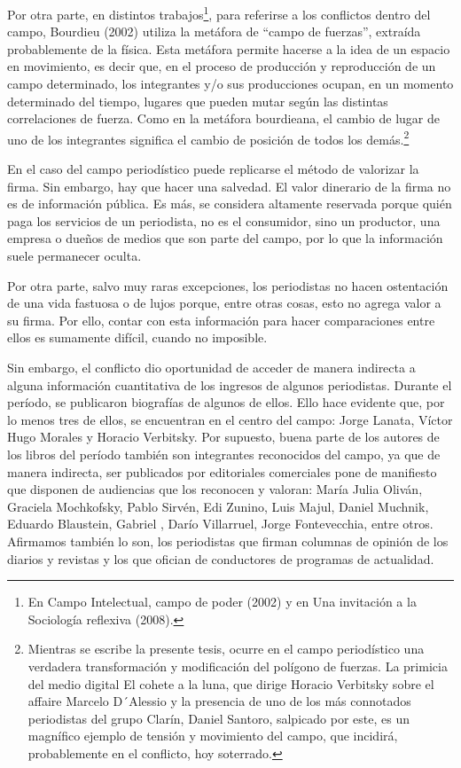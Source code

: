 Por otra parte, en distintos trabajos\footnote{En Campo Intelectual, campo de poder (2002) y en Una invitación a la Sociología reflexiva (2008).}, para referirse a los conflictos dentro del campo, Bourdieu (2002) utiliza la metáfora de ``campo de fuerzas'', extraída probablemente de la física. Esta metáfora permite hacerse a la idea de un espacio en movimiento, es decir que, en el proceso de producción y reproducción de un campo determinado, los integrantes y/o sus producciones ocupan, en un momento determinado del tiempo, lugares que pueden mutar según las distintas correlaciones de fuerza. Como en la metáfora bourdieana, el cambio de lugar de uno de los integrantes significa el cambio de posición de todos los demás.\footnote{Mientras se escribe la presente tesis, ocurre en el campo periodístico una verdadera transformación y modificación del polígono de fuerzas. La primicia del medio digital El cohete a la luna, que dirige Horacio Verbitsky sobre el affaire Marcelo D´Alessio y la presencia de uno de los más connotados periodistas del grupo Clarín, Daniel Santoro, salpicado por este, es un magnífico ejemplo de tensión y movimiento del campo, que incidirá, probablemente en el conflicto, hoy soterrado.}

En el caso del campo periodístico puede replicarse el método de valorizar la firma. Sin embargo, hay que hacer una salvedad. El valor dinerario de la firma no es de información pública. Es más, se considera altamente reservada porque quién paga los servicios de un periodista, no es el consumidor, sino un productor, una empresa o dueños de medios que son parte del campo, por lo que la información suele permanecer oculta.

Por otra parte, salvo muy raras excepciones, los periodistas no hacen ostentación de una vida fastuosa o de lujos porque, entre otras cosas, esto no agrega valor a su firma. Por ello, contar con esta información para hacer comparaciones entre ellos es sumamente difícil, cuando no imposible.

Sin embargo, el conflicto dio oportunidad de acceder de manera indirecta a alguna información cuantitativa de los ingresos de algunos periodistas. Durante el período, se publicaron biografías de algunos de ellos. Ello hace evidente que, por lo menos tres de ellos, se encuentran en el centro del campo: Jorge Lanata, Víctor Hugo Morales y Horacio Verbitsky. Por supuesto, buena parte de los autores de los libros del período también son integrantes reconocidos del campo, ya que de manera indirecta, ser publicados por editoriales comerciales pone de manifiesto que disponen de audiencias que los reconocen y valoran: María Julia Oliván, Graciela Mochkofsky, Pablo Sirvén, Edi Zunino, Luis Majul, Daniel Muchnik, Eduardo Blaustein, Gabriel , Darío Villarruel, Jorge Fontevecchia, entre otros. Afirmamos también lo son, los periodistas que firman columnas de opinión de los diarios y revistas y los que ofician de conductores de programas de actualidad.

